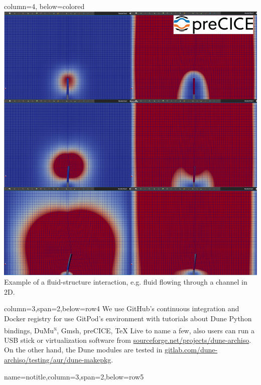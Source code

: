 \documentclass[
	paper=a0,
	style=ruled, %
	]{bfhsciposter}
\begin{document}
\begin{tcbposter}[
		poster={
				columns=4,
				rows=7,
				spacing=1cm,
			},]
	\begin{posterboxenv}{column=4, below=colored}
		\includegraphics[width=\linewidth]{sequence}
		Example of a fluid-structure interaction, e.g. fluid flowing through a channel in 2D.
	\end{posterboxenv}

	\begin{posterboxenv}[BFH-framed,title=GitHub's Docker registry
			\\
			\url{https://github.com/orgs/cpp-review-dune/packages}]{column=3,span=2,below=row4}
		We use GitHub's continuous integration and Docker registry for
		use GitPod's environment with tutorials about Dune Python
		bindings, DuMu\textsuperscript{x}, Gmsh, preCICE, TeX Live to
		name a few, also users can run a USB stick or virtualization
		software from \url{sourceforge.net/projects/dune-archiso}.
		On the other hand, the Dune modules are tested in
		\url{gitlab.com/dune-archiso/testing/aur/dune-makepkg}.
	\end{posterboxenv}

	\begin{posterboxenv}{name=notitle,column=3,span=2,below=row5}
		\nocite{*}
		
	\end{posterboxenv}

\end{tcbposter}
\end{document}
